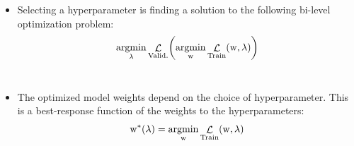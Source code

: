 \documentclass[landscape,a0b,final,a4resizeable]{include/a0poster}
\begin{document}
\begin{poster}
\begin{multicols}{3}
\newcommand{\hyper}{\lambda} %
\newcommand{\param}{\mathrm{w}} %
\newcommand{\innerLoss}[2]{\lossSymbolInner \! \left( #1, #2 \right)} %
\newcommand{\innerOpt}{\argmin_{\param} \innerLoss{\param}{\hyper}} %
\newcommand{\outerLoss}[1]{\lossSymbolOuter \! \left( #1 \right)}%
\newcommand{\outerOpt}[1]{\argmin_{\hyper} \outerLoss{#1}} %
%
\newcommand{\lossSymbol}{\mathop{\mathcal{L}}} %
\newcommand{\lossSymbolInner}{\lossSymbol_{\mathrm{Train}}} %
\newcommand{\lossSymbolOuter}{\lossSymbol_{\mathrm{Valid.}}} %
\newcommand{\innerOptParam}[1]{\param^{*} \! \left( #1 \right)} %

\begin{itemize}
	\item  Selecting a hyperparameter is finding a solution to the following bi-level optimization problem:
	\begin{align}
		\outerOpt{\innerOpt}
	\end{align}\\
	\item  The optimized model weights depend on the choice of hyperparameter.  This is a best-response function of the weights to the hyperparameters:
	\begin{align}
		\innerOptParam{\hyper} = \innerOpt
	\end{align}
\end{itemize}
\vphantom{A}


\newcommand{\rename}[1]{#1'}
\newcommand{\EhyperFix}[1]{\mathop{\mathbb{E}}_{p \left( \rename{\hyper} \right)} \! \left[ #1 \right]}
\newcommand{\responseParam}{\phi} %
\newcommand{\argminTargetFix}{\responseParam}
\newcommand{\hyperSupport}{\mathrm{support} \! \left( \phyper \right)} %
\newcommand{\hyperDomain}{\textnormal{for all } \hyper \in \hyperSupport}
\newcommand{\phyper}{p \left( \hyper \right)}
\newcommand{\proofLossFix}{\innerLoss{\approxResponse{\rename{\hyper}}{\responseParam}}{\rename{\hyper}}}
\newcommand{\approxResponseSymbol}[1]{\param_{#1}} %
\newcommand{\approxResponse}[2]{\approxResponseSymbol{#2} ( #1 )} %


\end{multicols}
\end{poster}
\end{document}
